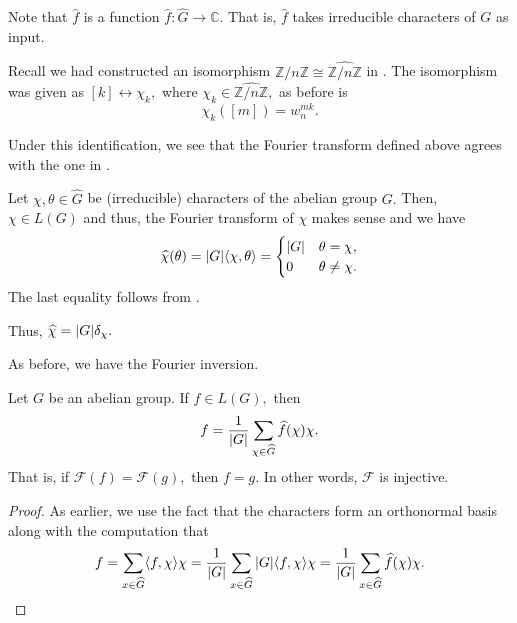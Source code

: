 Note that $\widehat{f}$ is a function $\widehat{f} : \widehat{G} \to \mathbb{C}.$ That is, $\widehat{f}$ takes irreducible characters of $G$ as input.

\begin{rem}
    Recall we had constructed an isomorphism $\mathbb{Z}/n\mathbb{Z} \cong \widehat{\mathbb{Z}/n\mathbb{Z}}$ in . The isomorphism was given as $[k] \leftrightarrow \chi_k,$ where $\chi_k \in \widehat{\mathbb{Z}/n\mathbb{Z}},$ as before is
    \begin{equation*} 
        \chi_k([m]) = w_n^{mk}.
    \end{equation*}

    Under this identification, we see that the Fourier transform defined above agrees with the one in .
\end{rem}

\begin{ex} \label{ex:fourtranschar}
    Let $\chi, \theta \in \widehat{G}$ be (irreducible) characters of the abelian group $G.$ Then, $\chi \in L(G)$ and thus, the Fourier transform of $\chi$ makes sense and we have
    \begin{equation*}
        \widehat{\chi}(\theta) = {\left\lvert G \right\lvert} \langle \chi, \theta\rangle = 
        \begin{cases}
            {\left\lvert G \right\lvert} & \theta = \chi, \\
            0 & \theta \neq \chi.
        \end{cases}
    \end{equation*}
    The last equality follows from .
    
    Thus, $\widehat{\chi} = {\left\lvert G \right\lvert} \delta_\chi.$
\end{ex}

As before, we have the Fourier inversion. 

\begin{thm} \label{thm:fourierinv}
    Let $G$ be an abelian group. If $f \in L(G),$ then
    \begin{equation*}
        f = \frac{1}{{\left\lvert G \right\lvert}}\sum_{\chi \in \widehat{G}} \widehat{f}(\chi)\chi.
    \end{equation*}
    That is, if $\mathcal{F}(f) = \mathcal{F}(g),$ then $f = g.$ In other words, $\mathcal{F}$ is injective.
\end{thm}
\begin{proof}
    As earlier, we use the fact that the characters form an orthonormal basis along with the computation that
    \begin{equation*}
        f = \sum_{x \in \widehat{G}}\langle f, \chi\rangle\chi = \frac{1}{{\left\lvert G \right\lvert}}\sum_{x \in \widehat{G}}{\left\lvert G \right\lvert}\langle f, \chi\rangle\chi = \frac{1}{{\left\lvert G \right\lvert}}\sum_{x \in \widehat{G}} \widehat{f}(\chi)\chi. \qedhere
    \end{equation*}
\end{proof}

